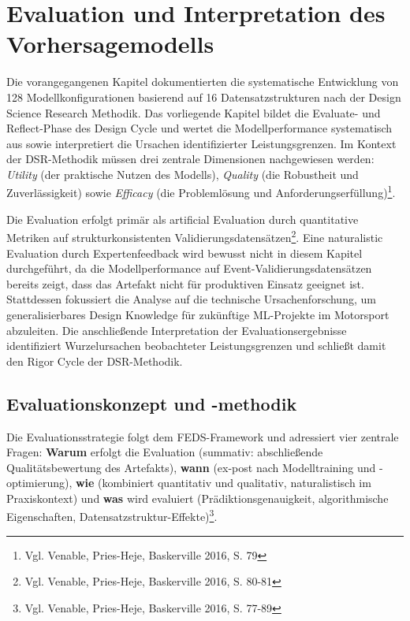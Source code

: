 \chapter{Evaluation und Interpretation des Vorhersagemodells}

Die vorangegangenen Kapitel dokumentierten die systematische Entwicklung von 128 Modellkonfigurationen basierend auf 16 Datensatzstrukturen nach der Design Science Research Methodik. Das vorliegende Kapitel bildet die Evaluate- und Reflect-Phase des Design Cycle und wertet die Modellperformance systematisch aus sowie interpretiert die Ursachen identifizierter Leistungsgrenzen. Im Kontext der DSR-Methodik müssen drei zentrale Dimensionen nachgewiesen werden: \textit{Utility} (der praktische Nutzen des Modells), \textit{Quality} (die Robustheit und Zuverlässigkeit) sowie \textit{Efficacy} (die Problemlösung und Anforderungserfüllung)\footnote{Vgl. Venable, Pries-Heje, Baskerville 2016, S. 79}.

Die Evaluation erfolgt primär als artificial Evaluation durch quantitative Metriken auf strukturkonsistenten Validierungsdatensätzen\footnote{Vgl. Venable, Pries-Heje, Baskerville 2016, S. 80-81}. Eine naturalistic Evaluation durch Expertenfeedback wird bewusst nicht in diesem Kapitel durchgeführt, da die Modellperformance auf Event-Validierungsdatensätzen bereits zeigt, dass das Artefakt nicht für produktiven Einsatz geeignet ist. Stattdessen fokussiert die Analyse auf die technische Ursachenforschung, um generalisierbares Design Knowledge für zukünftige \ac{ML}-Projekte im Motorsport abzuleiten. Die anschließende Interpretation der Evaluationsergebnisse identifiziert Wurzelursachen beobachteter Leistungsgrenzen und schließt damit den Rigor Cycle der DSR-Methodik.


\section{Evaluationskonzept und -methodik}

Die Evaluationsstrategie folgt dem FEDS-Framework und adressiert vier zentrale Fragen: \textbf{Warum} erfolgt die Evaluation (summativ: abschließende Qualitätsbewertung des Artefakts), \textbf{wann} (ex-post nach Modelltraining und -optimierung), \textbf{wie} (kombiniert quantitativ und qualitativ, naturalistisch im Praxiskontext) und \textbf{was} wird evaluiert (Prädiktionsgenauigkeit, algorithmische Eigenschaften, Datensatzstruktur-Effekte)\footnote{Vgl. Venable, Pries-Heje, Baskerville 2016, S. 77-89}.

